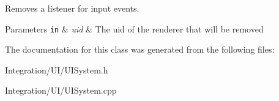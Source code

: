 Removes a listener for input events. 


\begin{DoxyParams}[1]{Parameters}
\mbox{\tt in}  & {\em uid} & The uid of the renderer that will be removed \\
\hline
\end{DoxyParams}


The documentation for this class was generated from the following files\-:\begin{DoxyCompactItemize}
\item 
Integration/\-U\-I/U\-I\-System.\-h\item 
Integration/\-U\-I/U\-I\-System.\-cpp\end{DoxyCompactItemize}
